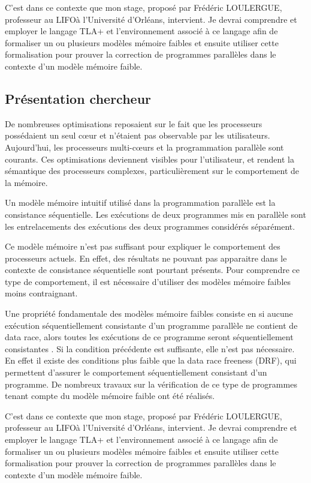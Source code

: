 \documentclass[12pt,a4paper]{article}
\begin{document}
C'est dans ce contexte que mon stage, proposé par Frédéric LOULERGUE, professeur au LIFO\footnotemark[1] à l'Université d'Orléans, intervient. Je devrai comprendre et employer le langage TLA+ \cite{Lamport:2002:SST:579617} et l'environnement associé à ce langage afin de formaliser un ou plusieurs modèles mémoire faibles et ensuite utiliser cette formalisation pour prouver la correction de programmes parallèles dans le contexte d'un modèle mémoire faible. 

\subsection{Présentation chercheur}
De nombreuses optimisations reposaient sur le fait que les processeurs possédaient un seul cœur et n'étaient pas observable par les utilisateurs.
Aujourd'hui, les processeurs multi-cœurs et la programmation parallèle sont courants. Ces optimisations deviennent visibles pour l'utilisateur, et rendent la sémantique des processeurs complexes, particulièrement sur le comportement de la mémoire.

Un modèle mémoire intuitif utilisé dans la programmation parallèle est la consistance séquentielle. Les exécutions de deux programmes mis en parallèle sont les entrelacements des exécutions des deux programmes considérés séparément.
 
Ce modèle mémoire n'est pas suffisant pour expliquer le comportement des processeurs actuels. En effet, des résultats ne pouvant pas apparaitre dans le contexte de consistance séquentielle sont pourtant présents. Pour comprendre ce type de comportement, il est nécessaire d'utiliser des modèles mémoire faibles \cite{Adve:1996:SMC:619013.620590} moins contraignant. 

Une propriété fondamentale des modèles mémoire faibles consiste en si aucune exécution séquentiellement consistante d'un programme parallèle ne contient de data race, alors toutes les exécutions de ce programme seront séquentiellement consistantes \cite{Saraswat:2007:TMM:1229428.1229469}.
Si la condition précédente est suffisante, elle n'est pas nécessaire. En effet il existe des conditions plus faible que la data race freeness (DRF), qui permettent d'assurer le comportement séquentiellement consistant d'un programme. De nombreux travaux sur la vérification de ce type de programmes tenant compte du modèle mémoire faible ont été réalisés.

C'est dans ce contexte que mon stage, proposé par Frédéric LOULERGUE, professeur au LIFO\footnotemark[1] à l'Université d'Orléans, intervient. Je devrai comprendre et employer le langage TLA+ \cite{Lamport:2002:SST:579617} et l'environnement associé à ce langage afin de formaliser un ou plusieurs modèles mémoire faibles et ensuite utiliser cette formalisation pour prouver la correction de programmes parallèles dans le contexte d'un modèle mémoire faible. 
 
\end{document}
